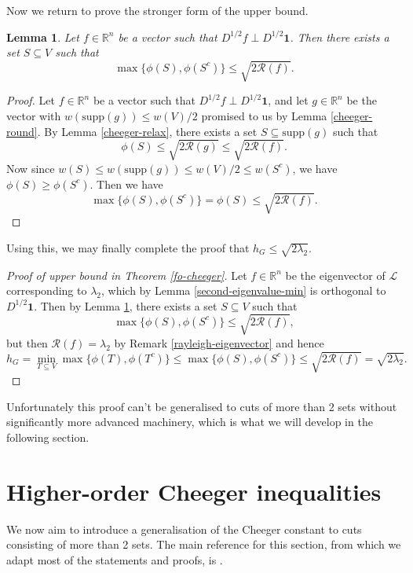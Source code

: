 \documentclass[a4paper,11pt]{article}
\newtheorem{lemma}[theorem]{Lemma}
\theoremstyle{definition}
\newcommand{\R}{\mathbb{R}}
\renewcommand{\L}{\mathcal{L}}
\newcommand{\rayleigh}[1]{\mathcal{R}\left(#1\right)}
\newcommand{\supp}[1]{\mathrm{supp}\left(#1\right)}
\begin{document}
Now we return to prove the stronger form of the upper bound.

\begin{lemma}\label{cheeger-upper-bound-strong}
Let $f \in \R^n$ be a vector such that $D^{1/2}f \perp D^{1/2}\bm{1}$. Then there exists a set $S \subseteq V$ such that
\[
\max \{ \phi(S), \phi(S^c) \} \le \sqrt{2\rayleigh{f}}.
\]
\end{lemma}
\begin{proof}
Let $f \in \R^n$ be a vector such that $D^{1/2}f \perp D^{1/2}\bm{1}$, and let $g \in \R^n$ be the vector with $w(\supp{g}) \le w(V)/2$ promised to us by Lemma \ref{cheeger-round}. By Lemma \ref{cheeger-relax}, there exists a set $S \subseteq \supp{g}$ such that
\[
\phi(S) \le \sqrt{2\rayleigh{g}} \le \sqrt{2\rayleigh{f}}.
\]
Now since $w(S) \le w(\supp{g}) \le w(V)/2 \le w(S^c)$, we have $\phi(S) \ge \phi(S^c)$. Then we have
\[
\max\{ \phi(S), \phi(S^c) \} = \phi(S) \le \sqrt{2\rayleigh{f}}.
\]
\end{proof}

Using this, we may finally complete the proof that $h_G \le \sqrt{2\lambda_2}$.

\begin{proof}[Proof of upper bound in Theorem \ref{fo-cheeger}]
Let $f \in \R^n$ be the eigenvector of $\L$ corresponding to $\lambda_2$, which by Lemma \ref{second-eigenvalue-min} is orthogonal to $D^{1/2}\bm{1}$. Then by Lemma \ref{cheeger-upper-bound-strong}, there exists a set $S \subseteq V$ such that
\[
\max \{ \phi(S), \phi(S^c) \} \le \sqrt{2\rayleigh{f}},
\]
but then $\rayleigh{f} = \lambda_2$ by Remark \ref{rayleigh-eigenvector} and hence
\[
h_G = \min_{T \subseteq V} \max \{ \phi(T), \phi(T^c) \} \le  \max \{ \phi(S), \phi(S^c) \} \le \sqrt{2\rayleigh{f}} = \sqrt{2\lambda_2}.
\]
\end{proof}

Unfortunately this proof can't be generalised to cuts of more than 2 sets without significantly more advanced machinery, which is what we will develop in the following section.

\section{Higher-order Cheeger inequalities}\label{ho-cheeger-section}
We now aim to introduce a generalisation of the Cheeger constant to cuts consisting of more than 2 sets. The main reference for this section, from which we adapt most of the statements and proofs, is \cite{main}.
\end{document}
